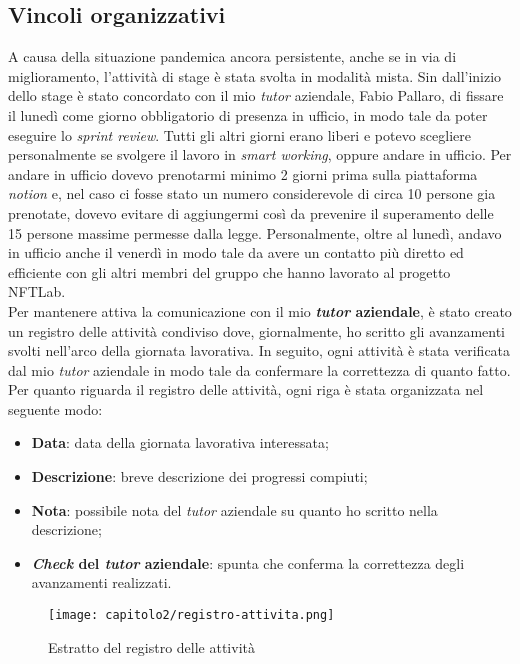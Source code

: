 \subsection{Vincoli organizzativi}
A causa della situazione pandemica ancora persistente, anche se in via di miglioramento, l'attività di stage è stata svolta in modalità mista. Sin dall'inizio dello stage è stato concordato con il mio \textit{tutor} aziendale, Fabio Pallaro, di fissare il lunedì come giorno obbligatorio di presenza in ufficio, in modo tale da poter eseguire lo \textit{sprint review}. 
Tutti gli altri giorni erano liberi e potevo scegliere personalmente se svolgere il lavoro in \textit{smart working}, oppure andare in ufficio. Per andare in ufficio dovevo prenotarmi minimo 2 giorni prima sulla piattaforma \textit{notion} e, nel caso ci fosse stato un numero considerevole di circa 10 persone gia prenotate, dovevo evitare di aggiungermi così da prevenire il superamento delle 15 persone massime permesse dalla legge.
Personalmente, oltre al lunedì, andavo in ufficio anche il venerdì in modo tale da avere un contatto più diretto ed efficiente con gli altri membri del gruppo che hanno lavorato al progetto NFTLab.\\

Per mantenere attiva la comunicazione con il mio \textbf{\textit{tutor} aziendale}, è stato creato un registro delle attività condiviso dove, giornalmente, ho scritto gli avanzamenti svolti nell'arco della giornata lavorativa. In seguito, ogni attività è stata verificata dal mio \textit{tutor} aziendale in modo tale da confermare la correttezza di quanto fatto. Per quanto riguarda il registro delle attività, ogni riga è stata organizzata nel seguente modo:
\begin{itemize}
  \item \textbf{Data}: data della giornata lavorativa interessata;
  \item \textbf{Descrizione}: breve descrizione dei progressi compiuti; 
  \item \textbf{Nota}: possibile nota del \textit{tutor} aziendale su quanto ho scritto nella descrizione;
  \item \textbf{\textit{Check} del \textit{tutor} aziendale}: spunta che conferma la correttezza degli avanzamenti realizzati.
\end{itemize}

\clearpage

\begin{figure}[!h]
  \centering
  \texttt{[image: capitolo2/registro-attivita.png]}
  \caption{Estratto del registro delle attività}
\end{figure}

